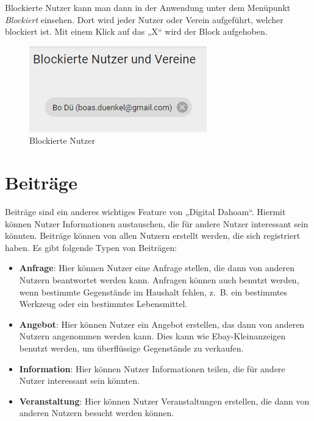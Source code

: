 Blockierte Nutzer kann man dann in der Anwendung unter dem Menüpunkt \textit{Blockiert} einsehen.
Dort wird jeder Nutzer oder Verein aufgeführt, welcher blockiert ist.
Mit einem Klick auf das „X“ wird der Block aufgehoben.

\begin{figure}[ht!]
    \begin{centering}
        \includegraphics[width=.5\textwidth]{figures/implementation/blocked.png}
        \caption{Blockierte Nutzer}
        \label{fig:blocked}
    \end{centering}
\end{figure}

\section{Beiträge}
\label{sec:contributions}

Beiträge sind ein anderes wichtiges Feature von „Digital Dahoam“.
Hiermit können Nutzer Informationen austauschen, die für andere Nutzer interessant sein könnten.
Beiträge können von allen Nutzern erstellt werden, die sich registriert haben.
Es gibt folgende Typen von Beiträgen:

\begin{itemize}
    \item \textbf{Anfrage}: Hier können Nutzer eine Anfrage stellen, die dann von anderen Nutzern beantwortet werden kann. Anfragen können auch benutzt werden, wenn bestimmte Gegenstände im Haushalt fehlen, z. B. ein bestimmtes Werkzeug oder ein bestimmtes Lebensmittel.
    \item \textbf{Angebot}: Hier können Nutzer ein Angebot erstellen, das dann von anderen Nutzern angenommen werden kann. Dies kann wie Ebay-Kleinanzeigen benutzt werden, um überflüssige Gegenstände zu verkaufen.
    \item \textbf{Information}: Hier können Nutzer Informationen teilen, die für andere Nutzer interessant sein könnten.
    \item \textbf{Veranstaltung}: Hier können Nutzer Veranstaltungen erstellen, die dann von anderen Nutzern besucht werden können.
\end{itemize}

